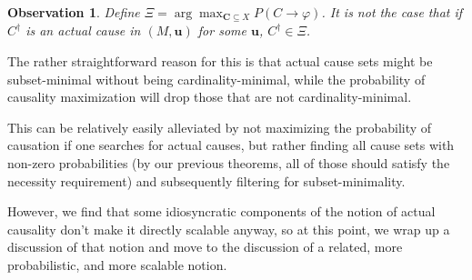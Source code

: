 \documentclass[twoside,11pt]{article}
\newtheorem{observation}[theorem]{Observation}
\begin{document}
\begin{observation}\label{obs:misalignment} Define $\Xi = \arg\max_{\mathbf{C} \subseteq {X}} P(C \rightarrow \varphi)$. It is not the case that if $C^\dagger$ is an actual cause in $(M, \mathbf{u})$ for some $\mathbf{u}$, $C^\dagger \in \Xi$.
\end{observation}

The rather straightforward reason for this is that actual cause sets might be subset-minimal without being cardinality-minimal, while the probability of causality maximization will drop those that are not cardinality-minimal.

This can be relatively easily alleviated by not maximizing the probability of causation if one searches for actual causes, but rather finding all cause sets with non-zero probabilities (by our previous theorems, all of those should satisfy the necessity requirement) and subsequently filtering for subset-minimality.

However, we find that some idiosyncratic components of the notion of actual causality don't make it directly scalable anyway, so at this point, we wrap up a discussion of that notion and move to the discussion of a related, more probabilistic, and more scalable notion.









\end{document}
